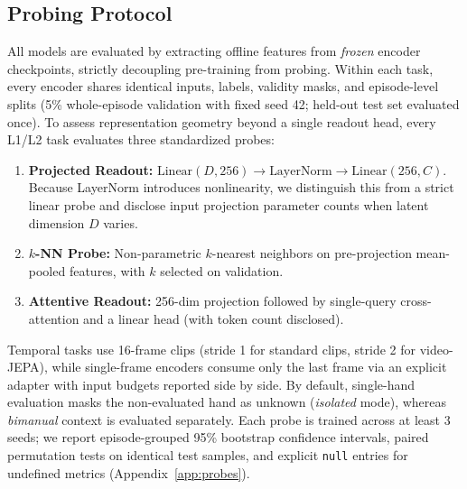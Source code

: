 \subsection{Probing Protocol}
\label{sec:protocol}
All models are evaluated by extracting offline features from \emph{frozen} encoder checkpoints, strictly decoupling pre-training from probing.
Within each task, every encoder shares identical inputs, labels, validity masks, and episode-level splits (5\% whole-episode validation with fixed seed 42; held-out test set evaluated once).
To assess representation geometry beyond a single readout head, every L1/L2 task evaluates three standardized probes:
\begin{enumerate}[leftmargin=*,nosep]
    \item \textbf{Projected Readout:} $\text{Linear}(D, 256) \rightarrow \text{LayerNorm} \rightarrow \text{Linear}(256, C)$. Because LayerNorm introduces nonlinearity, we distinguish this from a strict linear probe and disclose input projection parameter counts when latent dimension $D$ varies.
    \item \textbf{$k$-NN Probe:} Non-parametric $k$-nearest neighbors on pre-projection mean-pooled features, with $k$ selected on validation.
    \item \textbf{Attentive Readout:} 256-dim projection followed by single-query cross-attention and a linear head (with token count disclosed).
\end{enumerate}
Temporal tasks use 16-frame clips (stride 1 for standard clips, stride 2 for video-JEPA), while single-frame encoders consume only the last frame via an explicit adapter with input budgets reported side by side.
By default, single-hand evaluation masks the non-evaluated hand as unknown (\emph{isolated} mode), whereas \emph{bimanual} context is evaluated separately.
Each probe is trained across at least 3 seeds; we report episode-grouped 95\% bootstrap confidence intervals, paired permutation tests on identical test samples, and explicit \texttt{null} entries for undefined metrics (Appendix~\ref{app:probes}).


